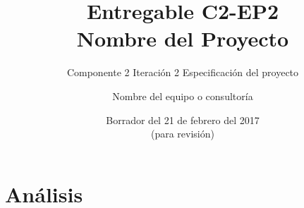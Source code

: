 \documentclass[10pt]{book}
\title{Entregable C2-EP2\bigskip\\Nombre del Proyecto}
\subtitle{Componente 2 Iteración 2 Especificación del proyecto}
\author{Nombre del equipo o consultoría}
\date{\color{red}Borrador del 21 de febrero del 2017\\(para revisión)}
\begin{document}
\maketitle
\thispagestyle{empty}


\frontmatter
\tableofcontents
\listoffigures 
\listoftables

% 

\mainmatter 


\chapter{Análisis}












\end{document}

